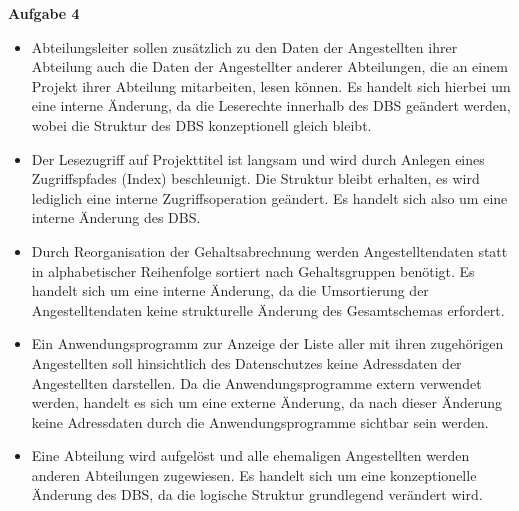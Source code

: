 \documentclass[a4paper,12pt]{article}
\newcommand{\Aufgabe}[1]{
        {
        \vspace*{0.5cm}
        \textbf{Aufgabe #1}
        \vspace*{0.2cm}
    }
}
\begin{document}
    \newpage

    \Aufgabe{4}
    \begin{itemize}
        \item Abteilungsleiter sollen zusätzlich zu den Daten der Angestellten ihrer Abteilung auch die Daten der
        Angestellter anderer Abteilungen, die an einem Projekt ihrer Abteilung mitarbeiten, lesen können.
        \newline Es handelt sich hierbei um eine interne Änderung, da die Leserechte innerhalb des DBS
        geändert werden, wobei die Struktur des DBS konzeptionell gleich bleibt.
        \item Der Lesezugriff auf Projekttitel ist langsam und wird durch Anlegen eines Zugriffspfades (Index)
        beschleunigt.
        \newline Die Struktur bleibt erhalten, es wird lediglich eine interne Zugriffsoperation geändert.
        Es handelt sich also um eine interne Änderung des DBS.
        \item Durch Reorganisation der Gehaltsabrechnung werden Angestelltendaten statt in alphabetischer Reihenfolge
        sortiert nach Gehaltsgruppen benötigt.
        \newline Es handelt sich um eine interne Änderung, da die Umsortierung der Angestelltendaten keine
        strukturelle Änderung des Gesamtschemas erfordert.
        \item Ein Anwendungsprogramm zur Anzeige der Liste aller mit ihren zugehörigen Angestellten soll hinsichtlich
        des Datenschutzes keine Adressdaten der Angestellten darstellen.
        \newline Da die Anwendungsprogramme extern verwendet werden, handelt es sich um eine externe Änderung, da
        nach dieser Änderung keine Adressdaten durch die Anwendungsprogramme sichtbar sein werden.
        \item Eine Abteilung wird aufgelöst und alle ehemaligen Angestellten werden anderen Abteilungen zugewiesen.
        \newline Es handelt sich um eine konzeptionelle Änderung des DBS, da die logische Struktur grundlegend verändert
        wird.
    \end{itemize}

    \newpage

\end{document}
